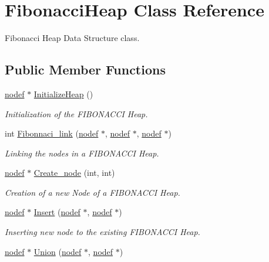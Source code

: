 \hypertarget{classFibonacciHeap}{}\section{Fibonacci\+Heap Class Reference}
\label{classFibonacciHeap}


Fibonacci Heap Data Structure class.  


\subsection*{Public Member Functions}
\begin{DoxyCompactItemize}
\item 
\hyperlink{structnodef}{nodef} $\ast$ \hyperlink{classFibonacciHeap_a4ce8acd46859e11a32a60bc5da633c54}{Initialize\+Heap} ()
\begin{DoxyCompactList}\small\item\em Initialization of the F\+I\+B\+O\+N\+A\+C\+CI Heap. \end{DoxyCompactList}\item 
int \hyperlink{classFibonacciHeap_a2d1913354a902b39426c5a8c1ab1ae2b}{Fibonnaci\+\_\+link} (\hyperlink{structnodef}{nodef} $\ast$, \hyperlink{structnodef}{nodef} $\ast$, \hyperlink{structnodef}{nodef} $\ast$)
\begin{DoxyCompactList}\small\item\em Linking the nodes in a F\+I\+B\+O\+N\+A\+C\+CI Heap. \end{DoxyCompactList}\item 
\hyperlink{structnodef}{nodef} $\ast$ \hyperlink{classFibonacciHeap_aed5f96128e896fbd90ae3bf14c96cc58}{Create\+\_\+node} (int, int)
\begin{DoxyCompactList}\small\item\em Creation of a new Node of a F\+I\+B\+O\+N\+A\+C\+CI Heap. \end{DoxyCompactList}\item 
\hyperlink{structnodef}{nodef} $\ast$ \hyperlink{classFibonacciHeap_a4a1714ab8218b63bb2c1491cb5459973}{Insert} (\hyperlink{structnodef}{nodef} $\ast$, \hyperlink{structnodef}{nodef} $\ast$)
\begin{DoxyCompactList}\small\item\em Inserting new node to the existing F\+I\+B\+O\+N\+A\+C\+CI Heap. \end{DoxyCompactList}\item 
\hyperlink{structnodef}{nodef} $\ast$ \hyperlink{classFibonacciHeap_ab7bee1fa4224c3a70c9bf5b7f282b50f}{Union} (\hyperlink{structnodef}{nodef} $\ast$, \hyperlink{structnodef}{nodef} $\ast$)

\end{DoxyCompactItemize}
